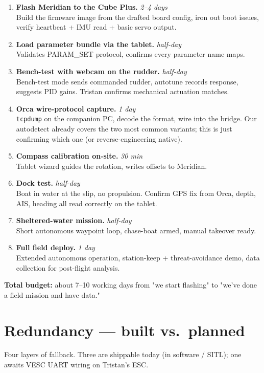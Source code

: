 \documentclass[10pt,a4paper]{article}
\begin{document}
\begin{enumerate}[leftmargin=*, itemsep=3pt]
\item \textbf{Flash Meridian to the Cube Plus.} \hfill \textit{2--4 days}\\
  Build the firmware image from the drafted board config, iron out boot issues, verify heartbeat + IMU read + basic servo output.
\item \textbf{Load parameter bundle via the tablet.} \hfill \textit{half-day}\\
  Validates PARAM\_SET protocol, confirms every parameter name maps.
\item \textbf{Bench-test with webcam on the rudder.} \hfill \textit{half-day}\\
  Bench-test mode sends commanded rudder, autotune records response, suggests PID gains. Tristan confirms mechanical actuation matches.
\item \textbf{Orca wire-protocol capture.} \hfill \textit{1 day}\\
  \texttt{tcpdump} on the companion PC, decode the format, wire into the bridge. Our autodetect already covers the two most common variants; this is just confirming which one (or reverse-engineering native).
\item \textbf{Compass calibration on-site.} \hfill \textit{30 min}\\
  Tablet wizard guides the rotation, writes offsets to Meridian.
\item \textbf{Dock test.} \hfill \textit{half-day}\\
  Boat in water at the slip, no propulsion. Confirm GPS fix from Orca, depth, AIS, heading all read correctly on the tablet.
\item \textbf{Sheltered-water mission.} \hfill \textit{half-day}\\
  Short autonomous waypoint loop, chase-boat armed, manual takeover ready.
\item \textbf{Full field deploy.} \hfill \textit{1 day}\\
  Extended autonomous operation, station-keep + threat-avoidance demo, data collection for post-flight analysis.
\end{enumerate}

\textbf{Total budget:} about 7--10 working days from "we start flashing" to "we've done a field mission and have data."

\pagebreak

\section{Redundancy — built vs.\ planned}
Four layers of fallback. Three are shippable today (in software / SITL);
one awaits VESC UART wiring on Tristan's ESC.
\end{document}
